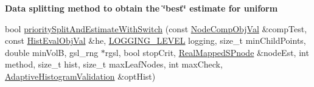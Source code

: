 \begin{Indent}{\bf \-Data splitting method to obtain the \char`\"{}best\char`\"{} estimate for uniform}
\begin{DoxyCompactItemize}
bool \hyperlink{classsubpavings_1_1AdaptiveHistogramValidation_ad3f8cf7cf11ce1214abd2559bea54393}{priority\-Split\-And\-Estimate\-With\-Switch} (const \hyperlink{classsubpavings_1_1NodeCompObjVal}{\-Node\-Comp\-Obj\-Val} \&comp\-Test, const \hyperlink{classsubpavings_1_1HistEvalObjVal}{\-Hist\-Eval\-Obj\-Val} \&he, \hyperlink{namespacesubpavings_aef8e51096b59ecaf1a1e9b2ee24b6089}{\-L\-O\-G\-G\-I\-N\-G\-\_\-\-L\-E\-V\-E\-L} logging, size\-\_\-t min\-Child\-Points, double min\-Vol\-B, gsl\-\_\-rng $\ast$rgsl, bool stop\-Crit, \hyperlink{classsubpavings_1_1RealMappedSPnode}{\-Real\-Mapped\-S\-Pnode} \&node\-Est, int method, size\-\_\-t hist, size\-\_\-t max\-Leaf\-Nodes, int max\-Check, \hyperlink{classsubpavings_1_1AdaptiveHistogramValidation}{\-Adaptive\-Histogram\-Validation} \&opt\-Hist)
\end{DoxyCompactItemize}
\end{Indent}
